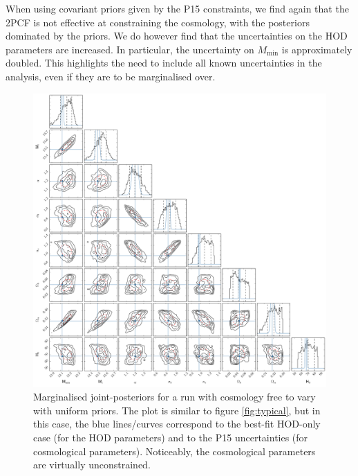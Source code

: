 \documentclass[5p]{elsarticle}
\begin{document}
When using covariant priors given by the P15 constraints, we find again that the 2PCF is not effective at constraining the cosmology, with the posteriors dominated by the priors. We do however find that the uncertainties on the HOD parameters are increased. In particular, the uncertainty on $M_\text{min}$ is approximately doubled. This highlights the need to include all known uncertainties in the analysis, even if they are to be marginalised over. 

 \begin{figure}
\centering
\includegraphics[width=\linewidth]{figures/with_cosmo_flat_triangle.pdf} 
\caption[Marginalised joint-posteriors for a run with cosmology free to vary with uniform priors]{Marginalised joint-posteriors for a run with cosmology free to vary with uniform priors. The plot is similar to figure \ref{fig:typical}, but in this case, the blue lines/curves correspond to the best-fit HOD-only case (for the HOD parameters) and to the P15 uncertainties (for cosmological parameters). Noticeably, the cosmological parameters are virtually unconstrained.}
\label{fig:with_cosmo_flat}
\end{figure}
\end{document}
